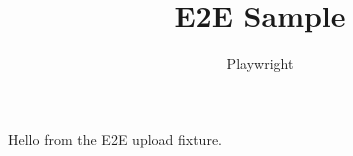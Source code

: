 \documentclass{article}
\title{E2E Sample}
\author{Playwright}
\begin{document}
\maketitle
Hello from the E2E upload fixture.
\end{document}
